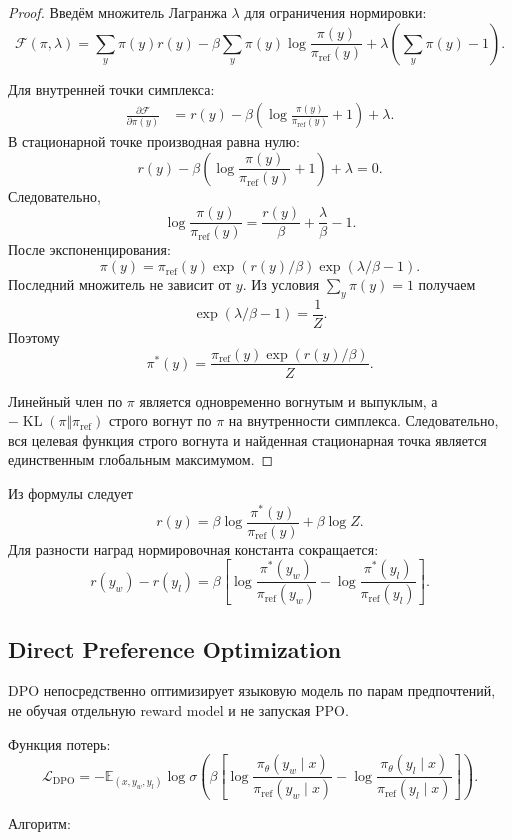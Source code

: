 \documentclass[12pt,a4paper]{article}
\DeclareMathOperator{\KL}{KL}
\newcommand{\E}{\mathbb{E}}
\newcommand{\1}{\mathbf{1}}
\theoremstyle{definition}
\theoremstyle{remark}
\begin{document}
\begin{proof}
Введём множитель Лагранжа $\lambda$ для ограничения нормировки:
\[
\mathcal{F}(\pi,\lambda)
=
\sum_y\pi(y)r(y)
-
\beta\sum_y
\pi(y)\log\frac{\pi(y)}{\pi_{\mathrm{ref}}(y)}
+
\lambda\left(\sum_y\pi(y)-1\right).
\]

Для внутренней точки симплекса:
\begin{align*}
\frac{\partial\mathcal{F}}{\partial\pi(y)}
&=
r(y)
-
\beta
\left(
\log\frac{\pi(y)}{\pi_{\mathrm{ref}}(y)}+1
\right)
+
\lambda.
\end{align*}
В стационарной точке производная равна нулю:
\[
r(y)
-
\beta
\left(
\log\frac{\pi(y)}{\pi_{\mathrm{ref}}(y)}+1
\right)
+
\lambda=0.
\]
Следовательно,
\[
\log\frac{\pi(y)}{\pi_{\mathrm{ref}}(y)}
=
\frac{r(y)}{\beta}
+
\frac{\lambda}{\beta}
-1.
\]
После экспоненцирования:
\[
\pi(y)
=
\pi_{\mathrm{ref}}(y)
\exp(r(y)/\beta)
\exp(\lambda/\beta-1).
\]
Последний множитель не зависит от $y$. Из условия
$\sum_y\pi(y)=1$ получаем
\[
\exp(\lambda/\beta-1)=\frac{1}{Z}.
\]
Поэтому
\[
\pi^\ast(y)
=
\frac{
\pi_{\mathrm{ref}}(y)\exp(r(y)/\beta)
}{
Z
}.
\]

Линейный член по $\pi$ является одновременно вогнутым и выпуклым, а
$-\KL(\pi\Vert\pi_{\mathrm{ref}})$ строго вогнут по $\pi$ на внутренности
симплекса. Следовательно, вся целевая функция строго вогнута и найденная
стационарная точка является единственным глобальным максимумом.
\end{proof}

Из формулы следует
\[
r(y)
=
\beta
\log\frac{\pi^\ast(y)}{\pi_{\mathrm{ref}}(y)}
+
\beta\log Z.
\]
Для разности наград нормировочная константа сокращается:
\[
r(y_w)-r(y_l)
=
\beta
\left[
\log\frac{\pi^\ast(y_w)}{\pi_{\mathrm{ref}}(y_w)}
-
\log\frac{\pi^\ast(y_l)}{\pi_{\mathrm{ref}}(y_l)}
\right].
\]

\subsection{Direct Preference Optimization}

DPO непосредственно оптимизирует языковую модель по парам предпочтений,
не обучая отдельную reward model и не запуская PPO.

Функция потерь:
\[
\mathcal{L}_{\mathrm{DPO}}
=
-\E_{(x,y_w,y_l)}
\log\sigma
\left(
\beta
\left[
\log
\frac{\pi_\theta(y_w\mid x)}
{\pi_{\mathrm{ref}}(y_w\mid x)}
-
\log
\frac{\pi_\theta(y_l\mid x)}
{\pi_{\mathrm{ref}}(y_l\mid x)}
\right]
\right).
\]

Алгоритм:
\end{document}
